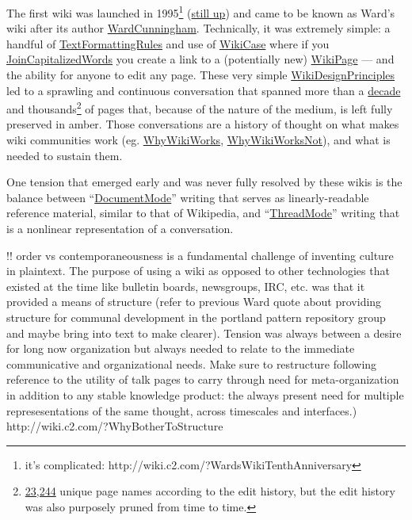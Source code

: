 \documentclass[notoc]{tufte-book}
\begin{document}
The first wiki was launched in 1995\footnote{it's complicated:
  http://wiki.c2.com/?WardsWikiTenthAnniversary}
(\href{http://wiki.c2.com/}{still up}) and came to be known as Ward's
wiki after its author
\href{http://wiki.c2.com/?WardCunningham}{WardCunningham}. Technically,
it was extremely simple: a handful of
\href{http://wiki.c2.com/?TextFormattingRules}{TextFormattingRules} and
use of \href{http://wiki.c2.com/?WikiCase}{WikiCase} where if you
\href{http://wiki.c2.com/?JoinCapitalizedWords}{JoinCapitalizedWords}
you create a link to a (potentially new)
\href{http://wiki.c2.com/?WikiPage}{WikiPage} --- and the ability for
anyone to edit any page. These very simple
\href{http://wiki.c2.com/?WikiDesignPrinciples}{WikiDesignPrinciples}
led to a sprawling and continuous conversation that spanned more than a
\href{http://wiki.c2.com/?WardsWikiTenthAnniversary}{decade} and
thousands\footnote{\href{http://c2.com/wiki/history/}{23,244} unique
  page names according to the edit history, but the edit history was
  also purposely pruned from time to time.} of pages that, because of
the nature of the medium, is left fully preserved in amber. Those
conversations are a history of thought on what makes wiki communities
work (eg. \href{http://wiki.c2.com/?WhyWikiWorks}{WhyWikiWorks},
\href{http://wiki.c2.com/?WhyWikiWorksNot}{WhyWikiWorksNot}), and what
is needed to sustain them.

One tension that emerged early and was never fully resolved by these
wikis is the balance between
``\href{http://wiki.c2.com/?DocumentMode}{DocumentMode}'' writing that
serves as linearly-readable reference material, similar to that of
Wikipedia, and ``\href{http://wiki.c2.com/?ThreadMode}{ThreadMode}''
writing that is a nonlinear representation of a conversation.

!! order vs contemporaneousness is a fundamental challenge of inventing
culture in plaintext. The purpose of using a wiki as opposed to other
technologies that existed at the time like bulletin boards, newsgroups,
IRC, etc. was that it provided a means of structure (refer to previous
Ward quote about providing structure for communal development in the
portland pattern repository group and maybe bring into text to make
clearer). Tension was always between a desire for long now organization
but always needed to relate to the immediate communicative and
organizational needs. Make sure to restructure following reference to
the utility of talk pages to carry through need for meta-organization in
addition to any stable knowledge product: the always present need for
multiple represesentations of the same thought, across timescales and
interfaces.) http://wiki.c2.com/?WhyBotherToStructure
\end{document}
